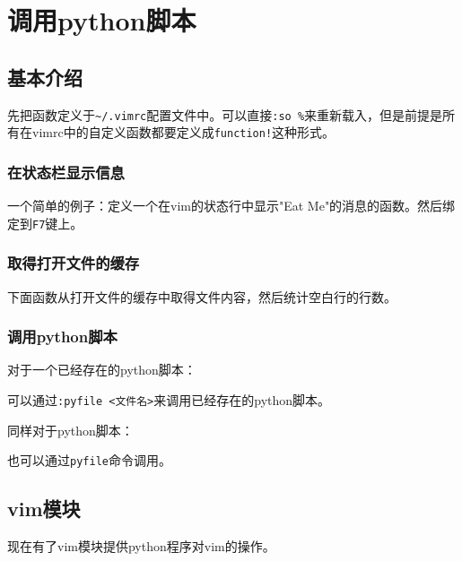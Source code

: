 
\chapter{调用python脚本}

	\section{基本介绍}

		先把函数定义于\verb|~/.vimrc|配置文件中。可以直接\verb|:so %|来重新载入，但是前提是所有在vimrc中的自定义函数都要定义成\verb|function!|这种形式。 

		\subsection{在状态栏显示信息}

			一个简单的例子：定义一个在vim的状态行中显示"Eat Me"的消息的函数。然后绑定到\verb|F7|键上。

			

		\subsection{取得打开文件的缓存}

			下面函数从打开文件的缓存中取得文件内容，然后统计空白行的行数。

			

		\subsection{调用python脚本}

			对于一个已经存在的python脚本：

			

			可以通过\verb|:pyfile <文件名>|来调用已经存在的python脚本。

			同样对于python脚本：

			

			也可以通过\verb|pyfile|命令调用。

	\section{vim模块}

		现在有了vim模块提供python程序对vim的操作。

